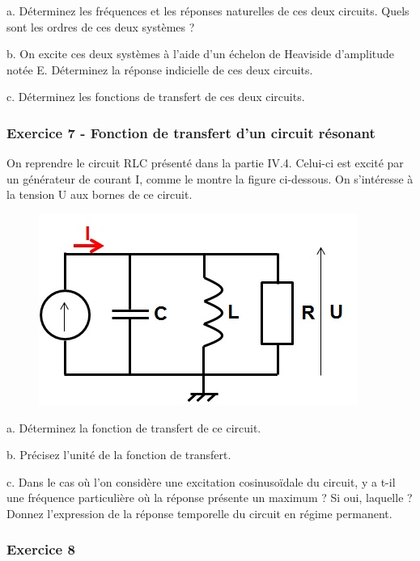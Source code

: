 \documentclass[11pt]{report}
\begin{document}
 	a. Déterminez les fréquences et les réponses naturelles de ces deux circuits. Quels sont les ordres de ces deux systèmes ? 
 	
 	b. On excite ces deux systèmes à l'aide d'un échelon de Heaviside d'amplitude notée E. Déterminez la réponse indicielle de ces deux circuits. 
 	
 	c. Déterminez les fonctions de transfert de ces deux circuits.
 	
 	\vspace{1\baselineskip}
 	
 	\subsubsection{Exercice 7 - Fonction de transfert d'un circuit résonant}
 	
 	On reprendre le circuit RLC présenté dans la partie IV.4. Celui-ci est excité par un générateur de courant I, comme le montre la figure ci-dessous. On s'intéresse à la tension U aux bornes de ce circuit. 
 	 	
 	\begin{figure}[h!]
 		\centering
 		\includegraphics[scale=0.5]{images/Exo_2_5.jpg} 
 	\end{figure} 
 
 	a. Déterminez la fonction de transfert de ce circuit. 
 	
 	b. Précisez l'unité de la fonction de transfert. 
 	
 	c. Dans le cas où l'on considère une excitation cosinusoïdale du circuit, y a t-il une fréquence particulière où la réponse présente un maximum ? Si oui, laquelle ? Donnez l'expression de la réponse temporelle du circuit en régime permanent.
 	
 	\vspace{1\baselineskip}
 	
 	\subsubsection{Exercice 8}
 	
\end{document}
